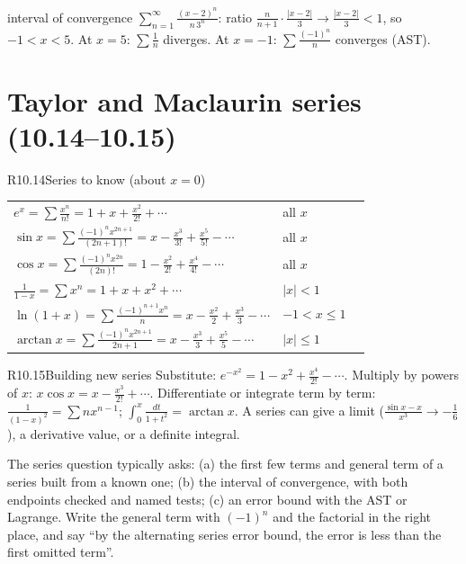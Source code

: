 \documentclass{apcalc}
\begin{document}
\begin{example}{interval of convergence}
$\displaystyle\sum_{n=1}^\infty\frac{(x-2)^n}{n\,3^n}$: ratio $\frac{n}{n+1}\cdot\frac{|x-2|}{3}\to\frac{|x-2|}{3}<1$, so $-1<x<5$. At $x=5$: $\sum\frac1n$ diverges. At $x=-1$: $\sum\frac{(-1)^n}{n}$ converges (AST). 
\end{example}

\section{Taylor and Maclaurin series (10.14--10.15)}

\begin{rulebox}{R10.14}{Series to know (about $x=0$)}
\begin{tabular}{@{}lll@{}}
$e^x=\sum\frac{x^n}{n!}=1+x+\frac{x^2}{2!}+\cdots$ & all $x$ \\
$\sin x=\sum\frac{(-1)^nx^{2n+1}}{(2n+1)!}=x-\frac{x^3}{3!}+\frac{x^5}{5!}-\cdots$ & all $x$\\
$\cos x=\sum\frac{(-1)^nx^{2n}}{(2n)!}=1-\frac{x^2}{2!}+\frac{x^4}{4!}-\cdots$ & all $x$\\
$\frac{1}{1-x}=\sum x^n=1+x+x^2+\cdots$ & $|x|<1$\\
$\ln(1+x)=\sum\frac{(-1)^{n+1}x^n}{n}=x-\frac{x^2}{2}+\frac{x^3}{3}-\cdots$ & $-1<x\le1$\\
$\arctan x=\sum\frac{(-1)^nx^{2n+1}}{2n+1}=x-\frac{x^3}{3}+\frac{x^5}{5}-\cdots$ & $|x|\le1$\\
\end{tabular}
\end{rulebox}

\begin{rulebox}{R10.15}{Building new series}
Substitute: $e^{-x^2}=1-x^2+\frac{x^4}{2!}-\cdots$. Multiply by powers of $x$: $x\cos x=x-\frac{x^3}{2!}+\cdots$. Differentiate or integrate term by term: $\frac{1}{(1-x)^2}=\sum nx^{n-1}$; $\int_0^x\frac{dt}{1+t^2}=\arctan x$. A series can give a limit ($\frac{\sin x-x}{x^3}\to-\frac16$), a derivative value, or a definite integral.
\end{rulebox}

\begin{frqtip}
The series question typically asks: (a) the first few terms and general term of a series built from a known one; (b) the interval of convergence, with both endpoints checked and named tests; (c) an error bound with the AST or Lagrange. Write the general term with $(-1)^n$ and the factorial in the right place, and say ``by the alternating series error bound, the error is less than the first omitted term''.
\end{frqtip}
\end{document}

